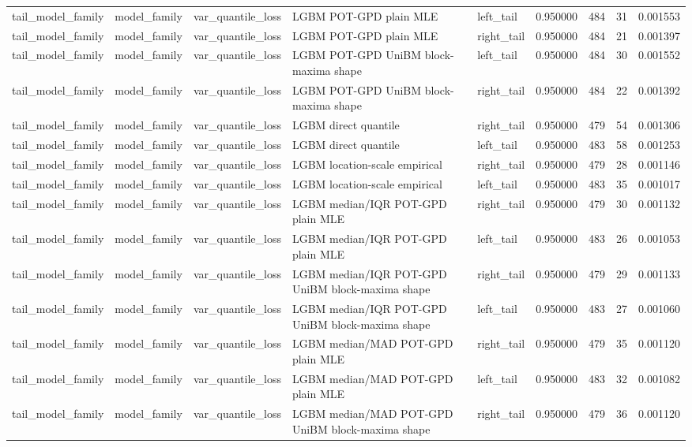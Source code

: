 \begin{tabular}{lllllrrr}
tail\_model\_family & model\_family & var\_quantile\_loss & LGBM POT-GPD plain MLE & left\_tail & 0.950000 & 484 & 31 & 0.001553 \\
tail\_model\_family & model\_family & var\_quantile\_loss & LGBM POT-GPD plain MLE & right\_tail & 0.950000 & 484 & 21 & 0.001397 \\
tail\_model\_family & model\_family & var\_quantile\_loss & LGBM POT-GPD UniBM block-maxima shape & left\_tail & 0.950000 & 484 & 30 & 0.001552 \\
tail\_model\_family & model\_family & var\_quantile\_loss & LGBM POT-GPD UniBM block-maxima shape & right\_tail & 0.950000 & 484 & 22 & 0.001392 \\
tail\_model\_family & model\_family & var\_quantile\_loss & LGBM direct quantile & right\_tail & 0.950000 & 479 & 54 & 0.001306 \\
tail\_model\_family & model\_family & var\_quantile\_loss & LGBM direct quantile & left\_tail & 0.950000 & 483 & 58 & 0.001253 \\
tail\_model\_family & model\_family & var\_quantile\_loss & LGBM location-scale empirical & right\_tail & 0.950000 & 479 & 28 & 0.001146 \\
tail\_model\_family & model\_family & var\_quantile\_loss & LGBM location-scale empirical & left\_tail & 0.950000 & 483 & 35 & 0.001017 \\
tail\_model\_family & model\_family & var\_quantile\_loss & LGBM median/IQR POT-GPD plain MLE & right\_tail & 0.950000 & 479 & 30 & 0.001132 \\
tail\_model\_family & model\_family & var\_quantile\_loss & LGBM median/IQR POT-GPD plain MLE & left\_tail & 0.950000 & 483 & 26 & 0.001053 \\
tail\_model\_family & model\_family & var\_quantile\_loss & LGBM median/IQR POT-GPD UniBM block-maxima shape & right\_tail & 0.950000 & 479 & 29 & 0.001133 \\
tail\_model\_family & model\_family & var\_quantile\_loss & LGBM median/IQR POT-GPD UniBM block-maxima shape & left\_tail & 0.950000 & 483 & 27 & 0.001060 \\
tail\_model\_family & model\_family & var\_quantile\_loss & LGBM median/MAD POT-GPD plain MLE & right\_tail & 0.950000 & 479 & 35 & 0.001120 \\
tail\_model\_family & model\_family & var\_quantile\_loss & LGBM median/MAD POT-GPD plain MLE & left\_tail & 0.950000 & 483 & 32 & 0.001082 \\
tail\_model\_family & model\_family & var\_quantile\_loss & LGBM median/MAD POT-GPD UniBM block-maxima shape & right\_tail & 0.950000 & 479 & 36 & 0.001120 \\

\end{tabular}
